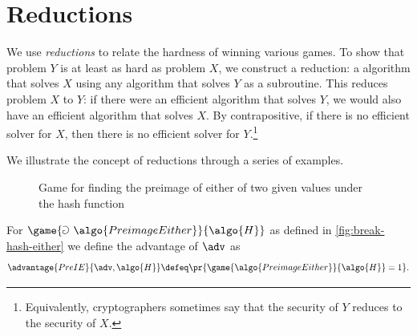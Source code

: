 \section{Reductions}
We use \emph{reductions} to relate the hardness of winning various games.
To show that problem $Y$ is at least as hard as problem $X$, we construct a reduction: a \ppt algorithm that solves $X$ using any algorithm that solves $Y$ as a subroutine.
This reduces problem $X$ to $Y$: if there were an efficient algorithm that solves $Y$, we would also have an efficient algorithm that solves $X$.
By contrapositive, if there is no efficient solver for $X$, then there is no efficient solver for $Y$.\footnote{Equivalently, cryptographers sometimes say that the security of $Y$ reduces to the security of $X$.}

We illustrate the concept of reductions through a series of examples.

\begin{figure}[tbhp]
  \begin{center}
    \begin{tcolorbox}[width=7cm]
      \begin{pchstack}[center]
      \end{pchstack}
    \end{tcolorbox}
  \end{center}
  \caption{Game for finding the preimage of either of two given values under the hash function \label{fig:break-hash-either}}
\end{figure}


\begin{definition}
  For $\game{\Game~\algo{PreimageEither}}{\algo{H}}$ as defined in \autoref{fig:break-hash-either} we define the advantage of $\adv$ as
 \[
  \advantage{PreIE}{\adv, \algo{H}} \defeq \pr{\game{\algo{PreimageEither}}{\algo{H}} = 1}.
 \]
\end{definition}

